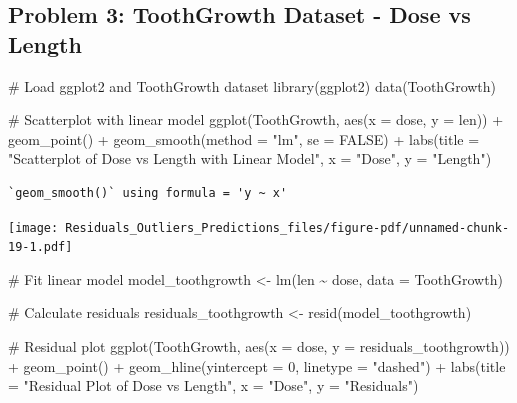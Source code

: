 \documentclass[
  letterpaper,
  DIV=11,
  numbers=noendperiod]{scrreprt}
\newenvironment{Shaded}{\begin{snugshade}}{\end{snugshade}}
\newcommand{\AttributeTok}[1]{\textcolor[rgb]{0.40,0.45,0.13}{#1}}
\newcommand{\CommentTok}[1]{\textcolor[rgb]{0.37,0.37,0.37}{#1}}
\newcommand{\ConstantTok}[1]{\textcolor[rgb]{0.56,0.35,0.01}{#1}}
\newcommand{\DecValTok}[1]{\textcolor[rgb]{0.68,0.00,0.00}{#1}}
\newcommand{\FunctionTok}[1]{\textcolor[rgb]{0.28,0.35,0.67}{#1}}
\newcommand{\NormalTok}[1]{\textcolor[rgb]{0.00,0.23,0.31}{#1}}
\newcommand{\OtherTok}[1]{\textcolor[rgb]{0.00,0.23,0.31}{#1}}
\newcommand{\SpecialCharTok}[1]{\textcolor[rgb]{0.37,0.37,0.37}{#1}}
\newcommand{\StringTok}[1]{\textcolor[rgb]{0.13,0.47,0.30}{#1}}
\begin{document}
\subsection*{Problem 3: ToothGrowth Dataset - Dose vs
Length}\label{problem-3-toothgrowth-dataset---dose-vs-length-2}

\begin{Shaded}
\begin{Highlighting}[]
\CommentTok{\# Load ggplot2 and ToothGrowth dataset}
\FunctionTok{library}\NormalTok{(ggplot2)}
\FunctionTok{data}\NormalTok{(ToothGrowth)}

\CommentTok{\# Scatterplot with linear model}
\FunctionTok{ggplot}\NormalTok{(ToothGrowth, }\FunctionTok{aes}\NormalTok{(}\AttributeTok{x =}\NormalTok{ dose, }\AttributeTok{y =}\NormalTok{ len)) }\SpecialCharTok{+}
  \FunctionTok{geom\_point}\NormalTok{() }\SpecialCharTok{+}
  \FunctionTok{geom\_smooth}\NormalTok{(}\AttributeTok{method =} \StringTok{"lm"}\NormalTok{, }\AttributeTok{se =} \ConstantTok{FALSE}\NormalTok{) }\SpecialCharTok{+}
  \FunctionTok{labs}\NormalTok{(}\AttributeTok{title =} \StringTok{"Scatterplot of Dose vs Length with Linear Model"}\NormalTok{, }\AttributeTok{x =} \StringTok{"Dose"}\NormalTok{, }\AttributeTok{y =} \StringTok{"Length"}\NormalTok{)}
\end{Highlighting}
\end{Shaded}

\begin{verbatim}
`geom_smooth()` using formula = 'y ~ x'
\end{verbatim}

\texttt{[image: Residuals\_Outliers\_Predictions\_files/figure-pdf/unnamed-chunk-19-1.pdf]}

\begin{Shaded}
\begin{Highlighting}[]
\CommentTok{\# Fit linear model}
\NormalTok{model\_toothgrowth }\OtherTok{\textless{}{-}} \FunctionTok{lm}\NormalTok{(len }\SpecialCharTok{\textasciitilde{}}\NormalTok{ dose, }\AttributeTok{data =}\NormalTok{ ToothGrowth)}

\CommentTok{\# Calculate residuals}
\NormalTok{residuals\_toothgrowth }\OtherTok{\textless{}{-}} \FunctionTok{resid}\NormalTok{(model\_toothgrowth)}

\CommentTok{\# Residual plot}
\FunctionTok{ggplot}\NormalTok{(ToothGrowth, }\FunctionTok{aes}\NormalTok{(}\AttributeTok{x =}\NormalTok{ dose, }\AttributeTok{y =}\NormalTok{ residuals\_toothgrowth)) }\SpecialCharTok{+}
  \FunctionTok{geom\_point}\NormalTok{() }\SpecialCharTok{+}
  \FunctionTok{geom\_hline}\NormalTok{(}\AttributeTok{yintercept =} \DecValTok{0}\NormalTok{, }\AttributeTok{linetype =} \StringTok{"dashed"}\NormalTok{) }\SpecialCharTok{+}
  \FunctionTok{labs}\NormalTok{(}\AttributeTok{title =} \StringTok{"Residual Plot of Dose vs Length"}\NormalTok{, }\AttributeTok{x =} \StringTok{"Dose"}\NormalTok{, }\AttributeTok{y =} \StringTok{"Residuals"}\NormalTok{)}
\end{Highlighting}
\end{Shaded}
\end{document}
